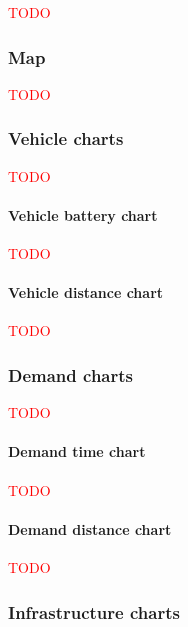 \documentclass[10pt,twocolumn]{article}
\begin{document}
\textcolor{red}{TODO}


\subsubsection{Map}

\textcolor{red}{TODO}

\subsubsection{Vehicle charts}

\textcolor{red}{TODO}

\paragraph{Vehicle battery chart}

\textcolor{red}{TODO}

\paragraph{Vehicle distance chart}

\textcolor{red}{TODO}

\subsubsection{Demand charts}

\textcolor{red}{TODO}

\paragraph{Demand time chart}

\textcolor{red}{TODO}

\paragraph{Demand distance chart}

\textcolor{red}{TODO}

\subsubsection{Infrastructure charts}
\end{document}
